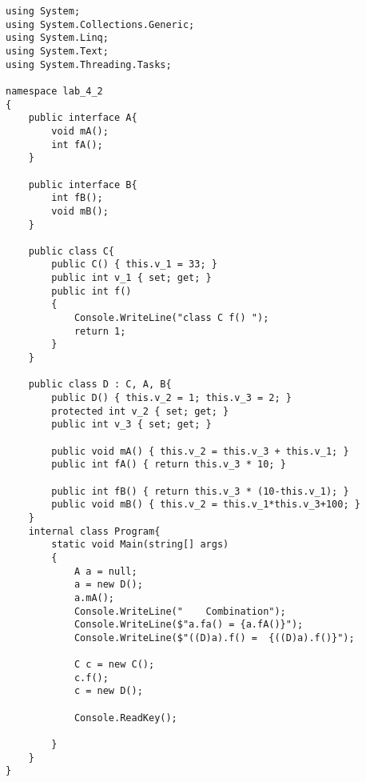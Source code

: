 \begin{lstlisting}[language={[Sharp]C}]
using System;
using System.Collections.Generic;
using System.Linq;
using System.Text;
using System.Threading.Tasks;

namespace lab_4_2
{
    public interface A{
        void mA();
        int fA();
    }

    public interface B{
        int fB();
        void mB();
    }

    public class C{
        public C() { this.v_1 = 33; }
        public int v_1 { set; get; }
        public int f()
        {
            Console.WriteLine("class C f() ");
            return 1;
        }
    }

    public class D : C, A, B{
        public D() { this.v_2 = 1; this.v_3 = 2; }
        protected int v_2 { set; get; }
        public int v_3 { set; get; }

        public void mA() { this.v_2 = this.v_3 + this.v_1; }
        public int fA() { return this.v_3 * 10; }

        public int fB() { return this.v_3 * (10-this.v_1); }
        public void mB() { this.v_2 = this.v_1*this.v_3+100; }
    }
    internal class Program{
        static void Main(string[] args)
        {
            A a = null;
            a = new D();
            a.mA();
            Console.WriteLine("    Combination");
            Console.WriteLine($"a.fa() = {a.fA()}");
            Console.WriteLine($"((D)a).f() =  {((D)a).f()}");

            C c = new C();
            c.f();
            c = new D();

            Console.ReadKey();

        }
    }
}


\end{lstlisting}